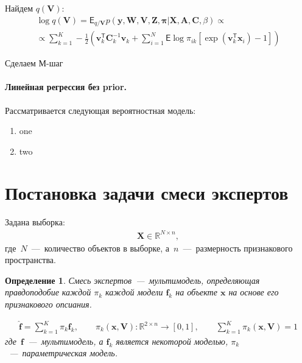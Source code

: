 \documentclass[12pt, twoside]{article}
\newtheorem{definition}{Определение}[section]
\numberwithin{equation}{section}
\begin{document}
Найдем $q\left(\textbf{V}\right)$:
\begin{equation}
\label{eq:st:36}
\begin{aligned}
\log q\left(\textbf{V}\right) =\mathsf{E}_{q/\textbf{V}}p\left(\textbf{y}, \textbf{W}, \textbf{V}, \textbf{Z}, \bm{\pi}|\textbf{X}, \textbf{A}, \textbf{C}, \beta\right) \propto \\
\propto \sum_{k=1}^{K}-\frac{1}{2}\left(\textbf{v}_k^{\mathsf{T}}\textbf{C}_k^{-1}\textbf{v}_k + \sum_{i=1}^{N}\mathsf{E}\log\pi_{ik}\left[\exp\left(\textbf{v}_{k}^{\mathsf{T}}\textbf{x}_i\right) - 1\right]\right)
\end{aligned}
\end{equation}

Сделаем М-шаг

\paragraph{Линейная регрессия без prior.} Рассматривается следующая вероятностная модель:
\begin{enumerate}
	\item one
	\item two
\end{enumerate}

\section{Постановка задачи смеси экспертов}

Задана выборка:
\begin{equation}
\label{eq:st:1}
\begin{aligned}
\textbf{X} \in \mathbb{R}^{N \times n},
\end{aligned}
\end{equation}
где~$N$~---~количество объектов в выборке, а~$n$~---~размерность признакового пространства.

\begin{definition}
Смесь экспертов~---~мультимодель, определяющая правдоподобие каждой $\pi_k$ каждой модели $\textbf{f}_k$ на объекте $\textbf{x}$ на основе его признакового опсиания.

\begin{equation}
\label{eq:st:2}
\begin{aligned}
\hat{\textbf{f}} = \sum_{k=1}^{K}\pi_{k}\textbf{f}_k, \qquad \pi_{k}\left(\textbf{x}, \textbf{V}\right):\mathbb{R}^{2\times n} \to [0, 1], \qquad \sum_{k=1}^{K}\pi_{k}\left(\textbf{x}, \textbf{V}\right) = 1
\end{aligned}
\end{equation}
где~$\textbf{f}$~---~мультимодель, а $\textbf{f}_k$ является некоторой моделью, $\pi_k$~---~параметрическая модель.
\end{definition}
\end{document}
